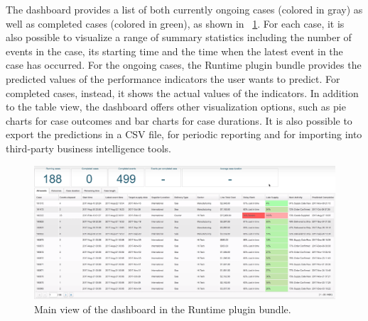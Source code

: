 \documentclass[runningheads,a4paper]{llncs}
\begin{document}
The dashboard provides a list of both currently ongoing cases (colored in gray) as well as completed cases (colored in green), as shown in \figurename~\ref{fig:nirdizati-runtime}. For each case, it is also possible to visualize a range of summary statistics including the number of events in the case, its starting time and the time when the latest event in the case has occurred. For the ongoing cases, the Runtime plugin bundle provides the predicted values of the performance indicators the user wants to predict. For completed cases, instead, it shows the actual values of the indicators. In addition to the table view, the dashboard offers other visualization options, such as pie charts for case outcomes and bar charts for case durations. It is also possible to export the predictions in a CSV file, for periodic reporting and for importing into third-party business intelligence tools.




\begin{figure}
	\centering
	\includegraphics[width=\textwidth]{img/nirdizati-runtime}
	\caption{Main view of the dashboard in the Runtime plugin bundle.}
	\label{fig:nirdizati-runtime}
\end{figure}
\end{document}
